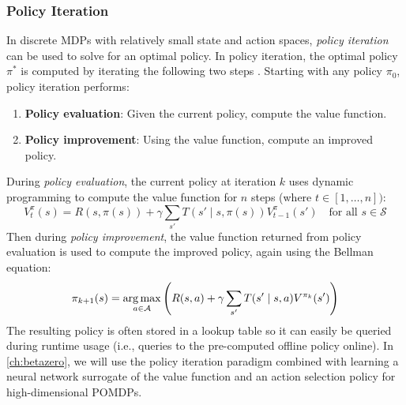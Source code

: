 \subsubsection{Policy Iteration}
In discrete MDPs with relatively small state and action spaces, \textit{policy iteration} \cite{bellman1957dynamic,sutton2018reinforcement} can be used to solve for an optimal policy.
In policy iteration, the optimal policy $\pi^*$ is computed by iterating the following two steps \cite{dmubook}.
Starting with any policy $\pi_0$, policy iteration performs:
\begin{enumerate}
    \item \textbf{Policy evaluation}: Given the current policy, compute the value function.
    \item \textbf{Policy improvement}: Using the value function, compute an improved policy.
\end{enumerate}
During \textit{policy evaluation}, the current policy at iteration $k$ uses dynamic programming to compute the value function for $n$ steps (where $t \in [1,\ldots,n])$:
\begin{equation}
    V^\pi_t(s) = R(s, \pi(s)) + \gamma \sum_{s'} T(s' \mid s, \pi(s)) V^\pi_{t-1}(s') \quad \text{for all } s \in \mathcal{S}
\end{equation}
Then during \textit{policy improvement}, the value function returned from policy evaluation is used to compute the improved policy, again using the Bellman equation:
\begin{equation}
    \pi_{k+1}(s) = \argmax_{a \in \mathcal{A}} \left( R(s,a) + \gamma \sum_{s^\prime} T(s^\prime \mid s, a)V^{\pi_k}(s^\prime) \right)
\end{equation}
The resulting policy is often stored in a lookup table \cite{dmubook} so it can easily be queried during runtime usage (i.e., queries to the pre-computed offline policy online).
In \cref{ch:betazero}, we will use the policy iteration paradigm combined with learning a neural network surrogate of the value function and an action selection policy for high-dimensional POMDPs.


